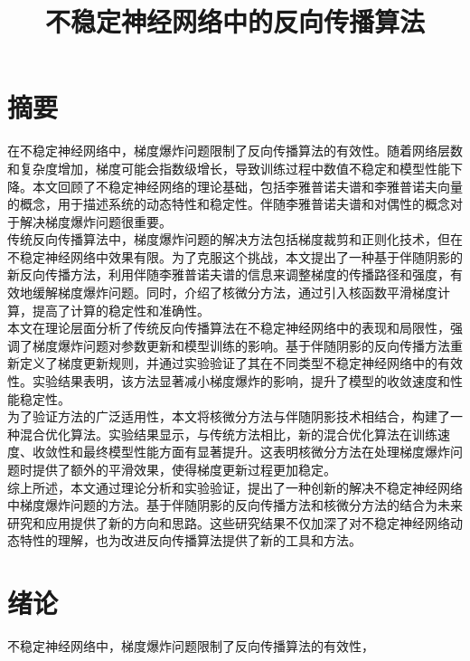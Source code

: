 \documentclass[12pt,a4paper]{amsart}
\title{不稳定神经网络中的反向传播算法}
\begin{document}
\maketitle

\section{摘要}

在不稳定神经网络中，梯度爆炸问题限制了反向传播算法的有效性。随着网络层数和复杂度增加，梯度可能会指数级增长，导致训练过程中数值不稳定和模型性能下降。本文回顾了不稳定神经网络的理论基础，包括李雅普诺夫谱和李雅普诺夫向量的概念，用于描述系统的动态特性和稳定性。伴随李雅普诺夫谱和对偶性的概念对于解决梯度爆炸问题很重要。\\

传统反向传播算法中，梯度爆炸问题的解决方法包括梯度裁剪和正则化技术，但在不稳定神经网络中效果有限。为了克服这个挑战，本文提出了一种基于伴随阴影的新反向传播方法，利用伴随李雅普诺夫谱的信息来调整梯度的传播路径和强度，有效地缓解梯度爆炸问题。同时，介绍了核微分方法，通过引入核函数平滑梯度计算，提高了计算的稳定性和准确性。\\

本文在理论层面分析了传统反向传播算法在不稳定神经网络中的表现和局限性，强调了梯度爆炸问题对参数更新和模型训练的影响。基于伴随阴影的反向传播方法重新定义了梯度更新规则，并通过实验验证了其在不同类型不稳定神经网络中的有效性。实验结果表明，该方法显著减小梯度爆炸的影响，提升了模型的收敛速度和性能稳定性。\\

为了验证方法的广泛适用性，本文将核微分方法与伴随阴影技术相结合，构建了一种混合优化算法。实验结果显示，与传统方法相比，新的混合优化算法在训练速度、收敛性和最终模型性能方面有显著提升。这表明核微分方法在处理梯度爆炸问题时提供了额外的平滑效果，使得梯度更新过程更加稳定。\\

综上所述，本文通过理论分析和实验验证，提出了一种创新的解决不稳定神经网络中梯度爆炸问题的方法。基于伴随阴影的反向传播方法和核微分方法的结合为未来研究和应用提供了新的方向和思路。这些研究结果不仅加深了对不稳定神经网络动态特性的理解，也为改进反向传播算法提供了新的工具和方法。\\

\section{绪论}

不稳定神经网络中，梯度爆炸问题限制了反向传播算法的有效性，
\end{document}
